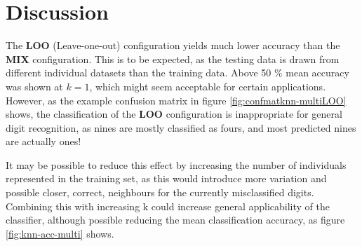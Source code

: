\section{Discussion}
The \textbf{LOO} (Leave-one-out) configuration
yields much lower accuracy than the \textbf{MIX} configuration.
This is to be expected, as the testing data is drawn from different individual datasets
than the training data. Above 50 \% mean accuracy was shown at \(k=1\),
which might seem acceptable for certain applications.
However, as the example confusion matrix in figure \ref{fig:confmatknn-multiLOO} shows,
the classification of the \textbf{LOO} configuration is inappropriate
for general digit recognition, as nines are mostly classified as fours,
and most predicted nines are actually ones!

It may be possible to reduce this effect by increasing the number
of individuals represented in the training set, as this would introduce more
variation and possible closer, correct, neighbours for the currently
misclassified digits.
Combining this with increasing k could increase general applicability of the classifier,
although possible reducing the mean classification accuracy,
as figure \ref{fig:knn-acc-multi} shows.
